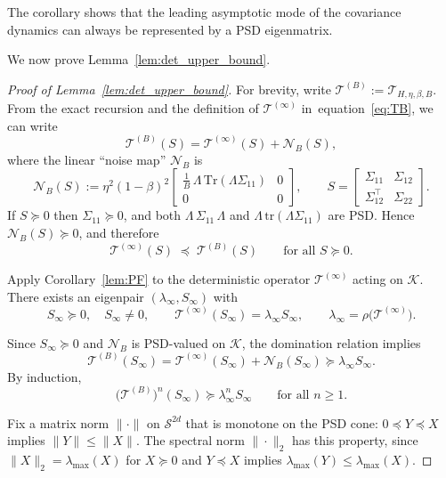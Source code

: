 \documentclass{article}
\def\eqref#1{equation~\ref{#1}}
\begin{document}
The corollary shows that the leading asymptotic mode of the covariance
dynamics can always be represented by a PSD eigenmatrix.

We now prove Lemma~\ref{lem:det_upper_bound}.

\begin{proof}[Proof of Lemma~\ref{lem:det_upper_bound}]
For brevity, write $\mathcal{T}^{(B)} := \mathcal{T}_{H,\eta,\beta,B}$.
From the exact recursion and the definition
of $\mathcal{T}^{(\infty)}$ in~\eqref{eq:TB}, we can write
\[
\mathcal{T}^{(B)}(S)
= \mathcal{T}^{(\infty)}(S) + \mathcal{N}_B(S),
\]
where the linear ``noise map'' $\mathcal{N}_B$ is
\[
\mathcal{N}_B(S)
:= \eta^2(1-\beta)^2
\begin{bmatrix}
\tfrac{1}{B}\,\Lambda\,\mathrm{Tr}(\Lambda\Sigma_{11}) & 0\\[3pt]
0 & 0
\end{bmatrix},
\qquad
S =
\begin{bmatrix}
\Sigma_{11} & \Sigma_{12}\\[2pt]
\Sigma_{12}^\top & \Sigma_{22}
\end{bmatrix}.
\]
If $S\succeq 0$ then $\Sigma_{11}\succeq 0$, and both
$\Lambda\,\Sigma_{11}\,\Lambda$ and $\Lambda\,\mathrm{tr}(\Lambda\Sigma_{11})$
are PSD. Hence $\mathcal{N}_B(S)\succeq 0$, and therefore
\[
\mathcal{T}^{(\infty)}(S)
\;\preceq\;
\mathcal{T}^{(B)}(S)
\qquad\text{for all }S\succeq 0.
\]

Apply Corollary~\ref{lem:PF} to the deterministic operator
$\mathcal{T}^{(\infty)}$ acting on $\mathcal{K}$. There exists an
eigenpair $(\lambda_\infty,S_\infty)$ with
\[
S_\infty \succeq 0,\quad S_\infty\neq 0,
\qquad
\mathcal{T}^{(\infty)}(S_\infty) = \lambda_\infty S_\infty,
\qquad
\lambda_\infty = \rho\big(\mathcal{T}^{(\infty)}\big).
\]

Since $S_\infty\succeq 0$ and $\mathcal{N}_B$ is PSD-valued on
$\mathcal{K}$, the domination relation implies
\[
\mathcal{T}^{(B)}(S_\infty)
= \mathcal{T}^{(\infty)}(S_\infty) + \mathcal{N}_B(S_\infty)
\succeq \lambda_\infty S_\infty.
\]
By induction,
\[
\big(\mathcal{T}^{(B)}\big)^n(S_\infty)
\succeq \lambda_\infty^n S_\infty
\qquad\text{for all }n\ge 1.
\]

Fix a matrix norm $\|\cdot\|$ on $\mathcal{S}^{2d}$ that is monotone on
the PSD cone: $0\preceq Y\preceq X$ implies $\|Y\|\le \|X\|$. The spectral
norm $\|\cdot\|_2$ has this property, since
$\|X\|_2=\lambda_{\max}(X)$ for $X\succeq 0$ and $Y\preceq X$ implies
$\lambda_{\max}(Y)\le\lambda_{\max}(X)$.


\end{proof}
\end{document}
